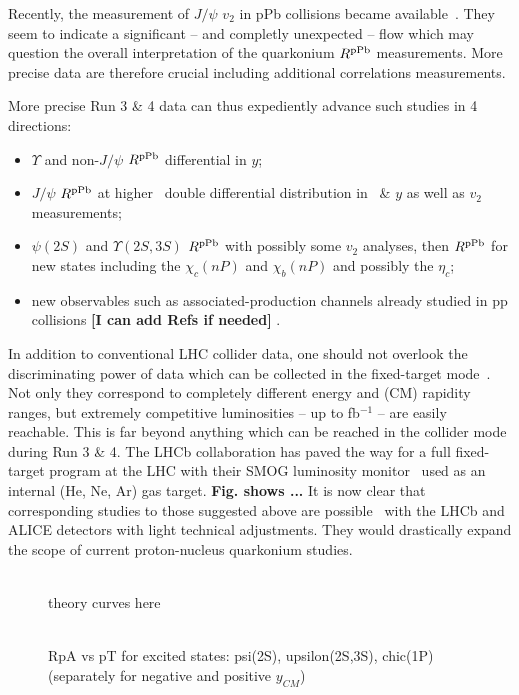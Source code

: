 \documentclass[../report.tex]{subfiles}
\begin{document}
Recently, the measurement of $J/\psi$ $v_2$ in pPb collisions became available~\cite{Acharya:2017tfn,CMS:2018xac}. They seem to indicate a significant -- and completly unexpected -- flow which may question the overall interpretation of the quarkonium $R^{\rm pPb}$ measurements. More precise data are therefore crucial including additional correlations measurements. 

More precise Run 3 \& 4 data can thus expediently advance such studies in 4 directions:  
\begin{itemize}
\item  $\Upsilon$ and non-$J/\psi$  $R^{\rm pPb}$ differential in $y$;
\item  $J/\psi$ $R^{\rm pPb}$ at higher \pT\, double differential distribution in \pT\ \& $y$ as well as $v_2$ measurements; 
\item $\psi(2S)$ and $\Upsilon(2S,3S)$ $R^{\rm pPb}$ with possibly some $v_2$ analyses,
then $R^{\rm pPb}$ for new states including  the  $\chi_c(nP)$ and $\chi_b(nP)$ and possibly the $\eta_c$;
\item new observables such as associated-production channels already studied in pp collisions {\bf [I can add Refs if needed]}  .



\end{itemize}
In addition to conventional LHC collider data, one should not overlook the discriminating power of data which can be collected in the fixed-target mode~\cite{Brodsky:2012vg,Lansberg:2012kf}. Not only they correspond to completely different energy and (CM) rapidity ranges, but extremely competitive luminosities -- up to fb$^{-1}$ -- are easily reachable. This is far beyond anything which can be reached in the collider mode during Run 3 \& 4. The LHCb collaboration has paved the way for a full fixed-target program at the LHC with their SMOG luminosity monitor~\cite{FerroLuzzi:2005em} used as an internal (He, Ne, Ar) gas target. {\bf Fig. shows ...\cite{LHCb:2017qap}} It is now clear that corresponding studies to those suggested above are possible~\cite{Hadjidakis:2018ifr} with the LHCb and ALICE detectors with light technical adjustments. They would drastically expand the scope of current proton-nucleus quarkonium studies.


\begin{figure}[hbt!]
 \begin{center}
 ~\\
 theory curves here
\\
~\\
 \end{center}
 \caption{RpA vs pT for excited states: psi(2S), upsilon(2S,3S), chic(1P) (separately for negative and positive $y_{CM}$)}
\end{figure}
\end{document}
